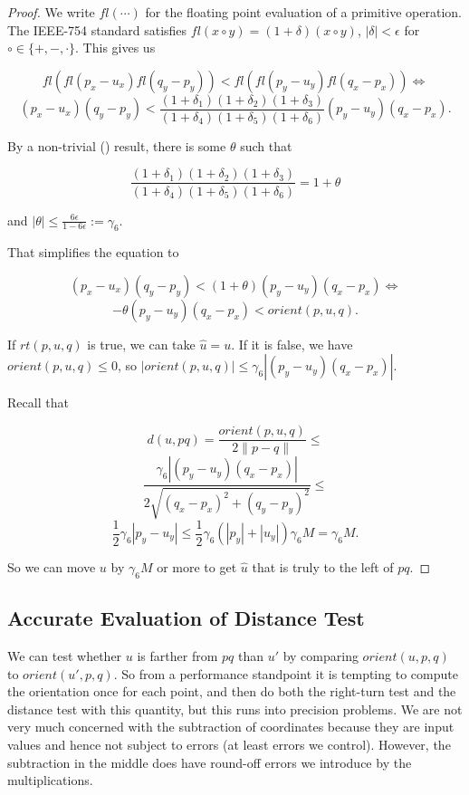 \begin{proof}
    We write $fl(\cdots)$ for the floating point evaluation of a primitive 
    operation. The IEEE-754 standard satisfies
    $fl(x \circ y) = (1 + \delta)(x \circ y)$, $|\delta| < \epsilon$ for
    $\circ \in \{+, -, \cdot\}$. This gives us

    $$fl(fl(p_x - u_x) fl(q_y - p_y)) < 
            fl(fl(p_y - u_y) fl(q_x - p_x)) \iff$$
    $$(p_x - u_x) (q_y - p_y) < \frac{(1 + \delta_1)(1 + \delta_2)(1 + \delta_3)}
    {(1 + \delta_4)(1 + \delta_5)(1 + \delta_6)} (p_y - u_y) (q_x - p_x).$$

    By a non-trivial () result, there is some $\theta$
    such that

    $$\frac{(1 + \delta_1)(1 + \delta_2)(1 + \delta_3)}{(1 + \delta_4)(1 + \delta_5)(1 + \delta_6)} = 1 + \theta$$

    and $|\theta| \leq \frac{6\epsilon}{1 - 6\epsilon} := \gamma_6$.

    That simplifies the equation to

    $$(p_x - u_x) (q_y - p_y) < (1 + \theta) (p_y - u_y) (q_x - p_x) \iff$$
    $$-\theta (p_y - u_y) (q_x - p_x) < orient(p, u, q).$$

    If $rt(p, u, q)$ is true, we can take $\hat{u} = u$. If it is false,
    we have $orient(p, u, q) \leq 0$, so
    $|orient(p, u, q)| \leq \gamma_6 |(p_y - u_y) (q_x - p_x)|$.

    Recall that 

    $$d(u, pq) = \frac{orient(p, u, q)}{2 \lVert p - q \rVert} \leq$$
    $$\frac{\gamma_6 |(p_y - u_y) (q_x - p_x)|}{2 \sqrt{(q_x - p_x)^2 + (q_y - p_y)^2}} \leq$$
    $$\frac{1}{2}\gamma_6 |p_y - u_y| \leq 
            \frac{1}{2} \gamma_6 (|p_y| + |u_y|)\gamma_6 M = \gamma_6 M.$$

    So we can move $u$ by $\gamma_6 M$ or more to get 
    $\hat{u}$ that is truly to the left of $pq$.
\end{proof}

\subsection{Accurate Evaluation of Distance Test}

We can test whether $u$ is farther from $pq$ than $u'$ by comparing
$orient(u, p, q)$ to $orient(u', p, q)$. So from a performance standpoint it
is tempting to compute the orientation once for each point, and then do both
the right-turn test and the distance test with this quantity, but this
runs into precision problems. We are not very much concerned with the
subtraction of coordinates because they are input values and hence not
subject to errors (at least errors we control). However, the subtraction 
in the middle does have round-off errors we introduce by the multiplications.

